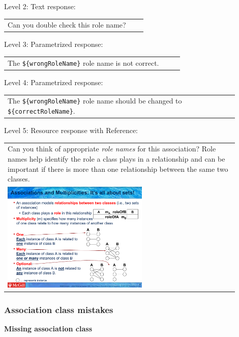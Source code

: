 \noindent Level 2: Text response: \medskip

\begin{tabular}{|p{0.9\linewidth}}
Can you double check this role name?
\end{tabular} \medskip

\noindent Level 3: Parametrized response: \medskip

\begin{tabular}{|p{0.9\linewidth}}
The \verb|${wrongRoleName}| role name is not correct.
\end{tabular} \medskip

\noindent Level 4: Parametrized response: \medskip

\begin{tabular}{|p{0.9\linewidth}}
The \verb|${wrongRoleName}| role name should be changed to \verb|${correctRoleName}|.
\end{tabular} \medskip

\noindent Level 5: Resource response with Reference: \medskip

\begin{tabular}{|p{0.9\linewidth}}
Can you think of appropriate \textit{role names}
for this association? Role names help identify the role a class plays in a
relationship and can be important if there is more than one relationship
between the same two classes.

\\
\includegraphics[width=0.6\textwidth]{images/role_name.png}

\end{tabular} \medskip


\subsubsection{Association class mistakes}

\noindent \textbf{Missing association class} \medskip

